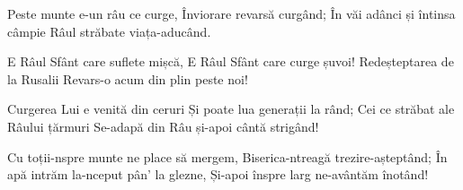 \beginverse
Peste munte e-un râu ce curge,
Înviorare revarsă curgând;
În văi adânci și întinsa câmpie
Râul străbate viața-aducând.
\endverse

\beginchorus
E Râul Sfânt care suflete mișcă,
E Râul Sfânt care curge șuvoi!
Redeșteptarea de la Rusalii
Revars-o acum din plin peste noi!
\endchorus

\beginverse
Curgerea Lui e venită din ceruri
Și poate lua generații la rând;
Cei ce străbat ale Râului țărmuri
Se-adapă din Râu și-apoi cântă strigând!
\endverse

\beginverse
Cu toții-nspre munte ne place să mergem,
Biserica-ntreagă trezire-așteptând;
În apă intrăm la-nceput pân' la glezne,
Și-apoi înspre larg ne-avântăm înotând!
\endverse
\endsong